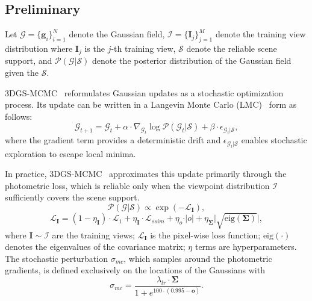 \documentclass[lettersize,journal]{IEEEtran}
\begin{document}
\subsection{Preliminary}

Let $\mathcal{G} = \{\mathbf{g}_i\}_{i=1}^N$ denote the Gaussian field, $\mathcal{I} = \{\mathbf{I}_j\}_{j=1}^M$ denote the training view distribution where $\mathbf{I}_j$ is the $j$-th training view, $\mathcal{S}$ denote the reliable scene support, and $\mathcal{P}(\mathcal{G} \vert \mathcal{S})$ denote the posterior distribution of the Gaussian field given the $\mathcal{S}$. 

3DGS-MCMC~\cite{mcmc} reformulates Gaussian updates as a stochastic optimization process. Its update can be written in a Langevin Monte Carlo (LMC)~\cite{sgld} form as follows:
\begin{equation}
    \mathcal{G}_{t+1} = \mathcal{G}_t + \alpha \cdot \nabla_{\mathcal{G}_t} \log \mathcal{P}(\mathcal{G}_t \vert \mathcal{S}) + \beta \cdot \epsilon_{\mathcal{G}_t \vert \mathcal{S}}, 
    \label{eq1}
\end{equation}
where the gradient term provides a deterministic drift and $\epsilon_{\mathcal{G}_t \vert \mathcal{S}}$ enables stochastic exploration to escape local minima.

In practice, 3DGS-MCMC~\cite{mcmc} approximates this update primarily through the photometric loss, which is reliable only when the viewpoint distribution $\mathcal{I}$ sufficiently covers the scene support.
\begin{equation}
    \mathcal{P}(\mathcal{G} \vert \mathcal{S}) \propto \exp \left( - \mathcal{L}_{\mathbf{I}} \right), 
    \label{eq2}
\end{equation}
\begin{equation}
    \mathcal{L}_{\mathbf{I}} = \left( 1 - \eta_{\mathbf{I}} \right) \cdot \mathcal{L}_{1} + \eta_{\mathbf{I}} \cdot \mathcal{L}_{ssim} + \eta_{o} \cdot \vert o \vert + \eta_{\mathbf{\Sigma}} \vert \sqrt{\text{eig}(\mathbf{\Sigma})} \vert, 
    \label{eq3}
\end{equation}
where $\mathbf{I} \sim \mathcal{I}$ are the training views; $\mathcal{L}_{\mathbf{I}}$ is the pixel-wise loss function; $\text{eig}(\cdot)$ denotes the eigenvalues of the covariance matrix; $\eta$ terms are hyperparameters.
The stochastic perturbation $\sigma_{mc}$, which samples around the photometric gradients, is defined exclusively on the locations of the Gaussians with 
\begin{equation}
    \sigma_{mc} = \frac{\lambda_{lr} \cdot \mathbf{\Sigma}}{1 + e^{100 \cdot \left( 0.995 - \mathbf{o} \right)}}.
    \label{eq4}
\end{equation}
\end{document}
